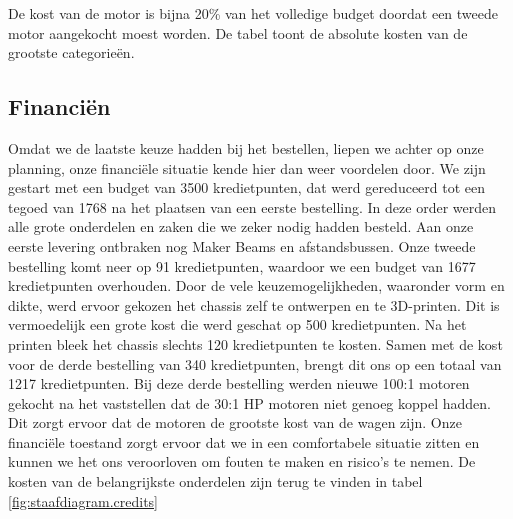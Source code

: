 \documentclass[a4paper,kulak]{kulakarticle}
\begin{document}
\begin{table}[h]
	
	\caption{De kost van de motor is bijna 20\% van het volledige budget doordat een tweede motor aangekocht moest worden. De tabel toont de absolute kosten van de grootste categorieën.}\label{fig:staafdiagram.credits}
\end{table}
\subsection{Financiën}

Omdat we de laatste keuze hadden bij het bestellen, liepen we achter op onze planning, onze financiële situatie kende hier dan weer voordelen door. We zijn gestart met een budget van 3500 kredietpunten, dat werd gereduceerd tot een tegoed van 1768 na het plaatsen van een eerste bestelling. In deze  order werden alle grote onderdelen en zaken die we zeker nodig hadden besteld.  Aan onze eerste levering ontbraken nog Maker Beams en afstandsbussen. Onze tweede bestelling komt neer op 91 kredietpunten, waardoor we een budget van 1677 kredietpunten overhouden. Door de vele keuzemogelijkheden, waaronder vorm en dikte, werd ervoor gekozen het chassis zelf te ontwerpen en te 3D-printen. Dit is vermoedelijk een grote kost die werd geschat op 500 kredietpunten. Na het printen bleek het chassis slechts 120 kredietpunten te kosten. Samen met de kost voor de derde bestelling van 340 kredietpunten, brengt dit ons op een totaal van 1217 kredietpunten. Bij deze derde bestelling werden nieuwe 100:1 motoren gekocht na het vaststellen dat de 30:1 HP motoren niet genoeg koppel hadden. Dit zorgt ervoor dat de motoren de grootste kost van de wagen zijn. Onze financiële toestand zorgt ervoor dat we in een comfortabele situatie zitten en kunnen we het ons veroorloven om fouten te maken en risico's te nemen. De kosten van de belangrijkste onderdelen zijn terug te vinden in tabel \ref{fig:staafdiagram.credits}
\end{document}
